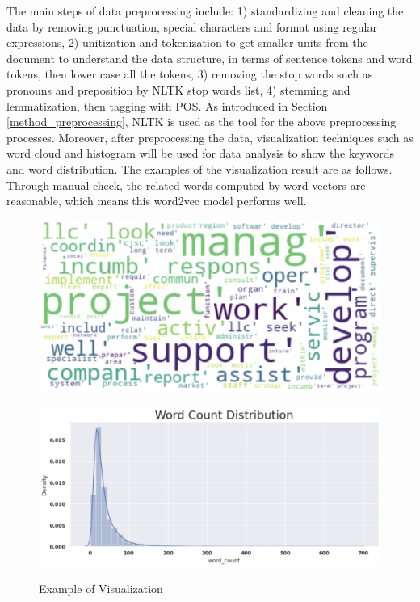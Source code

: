 The main steps of data preprocessing include: 1) standardizing and cleaning the data by removing punctuation, special characters and format using regular expressions, 2) unitization and tokenization to get smaller units from the document to understand the data structure, in terms of sentence tokens and word tokens, then lower case all the tokens, 3) removing the stop words such as pronouns and preposition by NLTK stop words list, 4) stemming and lemmatization, then tagging with POS. As introduced in Section \ref{method_preprocessing}, NLTK is used as the tool for the above preprocessing processes. Moreover, after preprocessing the data, visualization techniques such as word cloud and histogram will be used for data analysis to show the keywords and word distribution. The examples of the visualization result are as follows. Through manual check, the related words computed by word vectors are reasonable, which means this word2vec model performs well.

\begin{figure}[H]
    \begin{minipage}[t]{0.5\linewidth}
        \centering
        \includegraphics[scale=0.2]{images/wordcloud_exp.png}
        \label{fig:16}
    \end{minipage}%
    \begin{minipage}[t]{0.5\linewidth}
        \centering
        \includegraphics[scale=0.3]{images/distribution_exp.png}
        \label{fig:17}
    \end{minipage}
    \caption{Example of Visualization}
\end{figure}

